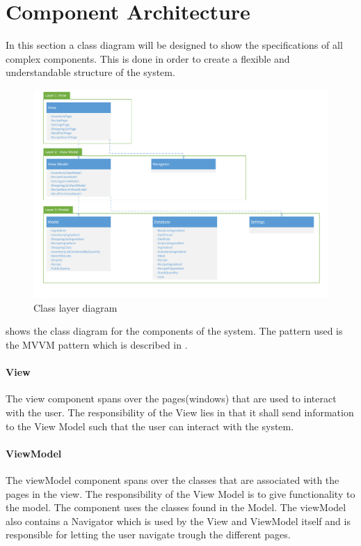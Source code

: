 \section{Component Architecture} \label{ComponentArchitecture}
In this section a class diagram will be designed to show the specifications of all complex components. This is done in order to create a flexible and understandable structure of the system.

\begin{figure}[H]
\includegraphics[width=\linewidth]{Grafik/FoodPlanner/ComponentDiagram}
\centering
\caption{Class layer diagram}
\label{LayerDiagram}
\end{figure}

 shows the class diagram for the components of the system. The pattern used is the MVVM pattern which is described in .

\paragraph{View}
The view component spans over the pages(windows) that are used to interact with the user. The responsibility of the View lies in that it shall send information to the View Model such that the user can interact with the system.

\paragraph{ViewModel}
The viewModel component spans over the classes that are associated with the pages in the view. The responsibility of the View Model is to give functionality to the model. The component uses the classes found in the Model. The viewModel also contains a Navigator which is used by the View and ViewModel itself and is responsible for letting the user navigate trough the different pages.

